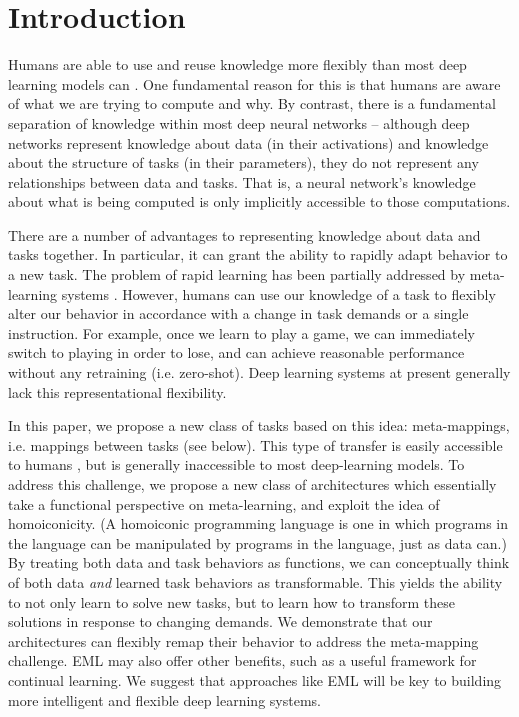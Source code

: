 \documentclass{article}
\begin{document}
\section{Introduction}
Humans are able to use and reuse knowledge more flexibly than most deep learning models can \citep[e.g.][]{Lake2016, Marcus2018}. One fundamental reason for this is that humans are aware of what we are trying to compute and why. By contrast, there is a fundamental separation of knowledge within most deep neural networks -- although deep networks represent knowledge about data (in their activations) and knowledge about the structure of tasks (in their parameters), they do not represent any relationships between data and tasks. That is, a neural network's knowledge about what is being computed is only implicitly accessible to those computations. \par
There are a number of advantages to representing knowledge about data and tasks together. In particular, it can grant the ability to rapidly adapt behavior to a new task. The problem of rapid learning has been partially addressed by meta-learning systems \citep[e.g.][]{Vinyals2016, Finn2017a}. However, humans can use our knowledge of a task to flexibly alter our behavior in accordance with a change in task demands or a single instruction. For example, once we learn to play a game, we can immediately switch to playing in order to lose, and can achieve reasonable performance without any retraining (i.e. zero-shot). Deep learning systems at present generally lack this representational flexibility. \par
In this paper, we propose a new class of tasks based on this idea: meta-mappings, i.e. mappings between tasks (see below). This type of transfer is easily accessible to humans \citep{Lake2016}, but is generally inaccessible to most deep-learning models. To address this challenge, we propose a new class of architectures which essentially take a functional perspective on meta-learning, and exploit the idea of homoiconicity. (A homoiconic programming language is one in which programs in the language can be manipulated by programs in the language, just as data can.) By treating both data and task behaviors as functions, we can conceptually think of both data \emph{and} learned task behaviors as transformable. This yields the ability to not only learn to solve new tasks, but to learn how to transform these solutions in response to changing demands. We demonstrate that our architectures can flexibly remap their behavior to address the meta-mapping challenge. EML may also offer other benefits, such as a useful framework for continual learning. We suggest that approaches like EML will be key to building more intelligent and flexible deep learning systems. \par
\end{document}

